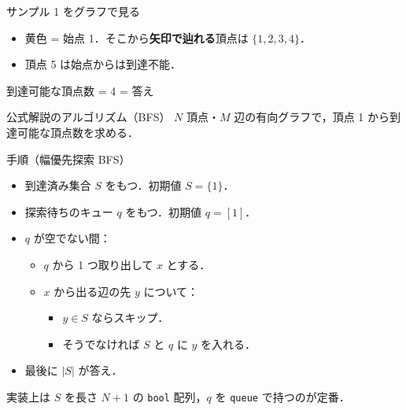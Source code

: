 \documentclass[dvipdfmx,aspectratio=169]{beamer}
\begin{document}
\begin{frame}{サンプル 1 をグラフで見る}
  \begin{center}
  \end{center}

  \vspace{0.4em}
  \begin{itemize}
    \item 黄色 = 始点 1．そこから\textbf{矢印で辿れる}頂点は $\{1,2,3,4\}$．
    \item 頂点 5 は始点からは到達不能．
  \end{itemize}

  \begin{alertblock}{到達可能な頂点数 = 4 = 答え}
  \end{alertblock}
\end{frame}

\begin{frame}{公式解説のアルゴリズム（BFS）}
  $N$ 頂点・$M$ 辺の有向グラフで，頂点 1 から到達可能な頂点数を求める．

  \vspace{0.6em}
  \begin{block}{手順（幅優先探索 BFS）}
    \begin{itemize}
      \item 到達済み集合 $S$ をもつ．初期値 $S = \{1\}$．
      \item 探索待ちのキュー $q$ をもつ．初期値 $q = [1]$．
      \item $q$ が空でない間：
        \begin{itemize}
          \item $q$ から 1 つ取り出して $x$ とする．
          \item $x$ から出る辺の先 $y$ について：
            \begin{itemize}
              \item $y \in S$ ならスキップ．
              \item そうでなければ $S$ と $q$ に $y$ を入れる．
            \end{itemize}
        \end{itemize}
      \item 最後に $|S|$ が答え．
    \end{itemize}
  \end{block}

  実装上は $S$ を長さ $N+1$ の \texttt{bool} 配列，$q$ を \texttt{queue} で持つのが定番．
\end{frame}
\end{document}
